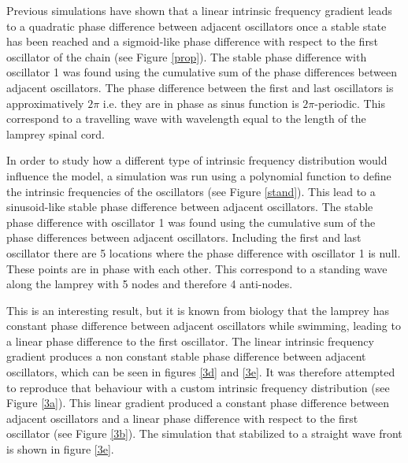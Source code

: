 \documentclass[a4paper]{scrartcl}
\begin{document}
Previous simulations have shown that a linear intrinsic frequency gradient leads to a quadratic phase difference between adjacent oscillators once a stable state has been reached and a sigmoid-like phase difference with respect to the first oscillator of the chain (see Figure \ref{prop}). The stable phase difference with oscillator 1 was found using the cumulative sum of the phase differences between adjacent oscillators. The phase difference between the first and last oscillators is approximatively $2\pi$ i.e. they are in phase as sinus function is $2\pi$-periodic. This correspond to a travelling wave with wavelength equal to the length of the lamprey spinal cord.

In order to study how a different type of intrinsic frequency distribution would influence the model, a simulation was run using a polynomial function to define the intrinsic frequencies of the oscillators (see Figure \ref{stand}). This lead to a sinusoid-like stable phase difference between adjacent oscillators. The stable phase difference with oscillator 1 was found using the cumulative sum of the phase differences between adjacent oscillators. Including the first and last oscillator there are 5 locations where the phase difference with oscillator 1 is null. These points are in phase with each other. This correspond to a standing wave along the lamprey with 5 nodes and therefore 4 anti-nodes.

This is an interesting result, but it is known from biology that the lamprey has constant phase difference between adjacent oscillators while swimming, leading to a linear phase difference to the first oscillator. The linear intrinsic frequency gradient produces a non constant stable phase difference between  adjacent oscillators, which can be seen in figures \ref{3d} and \ref{3e}. It was therefore attempted to reproduce that behaviour with a custom intrinsic frequency distribution (see Figure \ref{3a}). This linear gradient produced a constant phase difference between adjacent oscillators and a linear phase difference with respect to the first oscillator (see Figure \ref{3b}). The simulation that stabilized to a straight wave front is shown in figure \ref{3e}.

\vspace{1cm}
\end{document}
